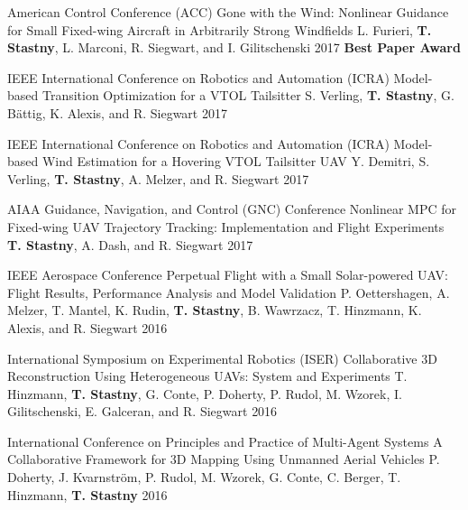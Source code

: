 \begin{cventries}
\cvpubentry
	{American Control Conference (ACC)} %
	{Gone with the Wind: Nonlinear Guidance for Small Fixed-wing Aircraft in Arbitrarily Strong Windfields} %
	{L. Furieri, \textbf{T. Stastny}, L. Marconi, R. Siegwart, and I. Gilitschenski} %
	{} %
	{2017} %
	{} %
	{\textbf{Best Paper Award}} %
	
\cvpubentry
	{IEEE International Conference on Robotics and Automation (ICRA)} %
	{Model-based Transition Optimization for a VTOL Tailsitter} %
	{S. Verling, \textbf{T. Stastny}, G. B{\"a}ttig, K. Alexis, and R. Siegwart} %
	{} %
	{2017} %
	{} %
	{} %
	
\cvpubentry
	{IEEE International Conference on Robotics and Automation (ICRA)} %
	{Model-based Wind Estimation for a Hovering VTOL Tailsitter UAV} %
	{Y. Demitri, S. Verling, \textbf{T. Stastny}, A. Melzer, and R. Siegwart} %
	{} %
	{2017} %
	{} %
	{} %
		
\cvpubentry
	{AIAA Guidance, Navigation, and Control (GNC) Conference} %
	{Nonlinear MPC for Fixed-wing UAV Trajectory Tracking: Implementation and Flight Experiments} %
	{\textbf{T. Stastny}, A. Dash, and R. Siegwart} %
	{} %
	{2017} %
	{} %
	{} %

\cvpubentry
	{IEEE Aerospace Conference} %
	{Perpetual Flight with a Small Solar-powered UAV: Flight Results, Performance Analysis and Model Validation} %
	{P. Oettershagen, A. Melzer, T. Mantel, K. Rudin, \textbf{T. Stastny}, B. Wawrzacz, T. Hinzmann, K. Alexis, and R. Siegwart} %
	{} %
	{2016} %
	{} %
	{} %


\cvpubentry
	{International Symposium on Experimental Robotics (ISER)} %
	{Collaborative 3D Reconstruction Using Heterogeneous UAVs: System and Experiments} %
	{T. Hinzmann, \textbf{T. Stastny}, G. Conte, P. Doherty, P. Rudol, M. Wzorek, I. Gilitschenski, E. Galceran, and R. Siegwart} %
	{} %
	{2016} %
	{} %
	{} %

\cvpubentry
	{International Conference on Principles and Practice of Multi-Agent Systems} %
	{A Collaborative Framework for 3D Mapping Using Unmanned Aerial Vehicles} %
	{P. Doherty, J. Kvarnstr{\"o}m, P. Rudol, M. Wzorek, G. Conte, C. Berger, T. Hinzmann, \textbf{T. Stastny}} %
	{} %
	{2016} %
	{} %
	{} %


\end{cventries}
